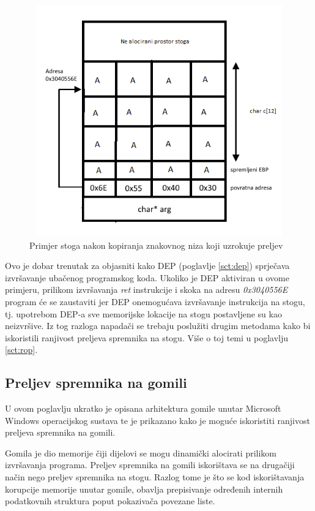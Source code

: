 \documentclass[times, utf8, diplomski, numeric]{fer}
\begin{document}
\begin{figure}[!ht]
\centering
\setlength\fboxsep{0pt}
\setlength\fboxrule{0.5pt}
\includegraphics[width=12cm, height=10cm]{slike/buffer_overflow_overflow}
\caption{Primjer stoga nakon kopiranja znakovnog niza koji uzrokuje preljev}
\label{fig:buff_overflow_overflow} 
\end{figure}

Ovo je dobar trenutak za objasniti kako DEP (poglavlje \ref{sct:dep}) 
sprječava izvršavanje ubačenog programskog koda. Ukoliko je DEP				%
aktiviran u ovome primjeru, prilikom izvršavanja \emph{ret}
instrukcije i skoka na adresu \emph{0x3040556E} program će se
zaustaviti jer DEP onemogućava izvršavanje instrukcija na stogu,
tj. upotrebom DEP-a sve memorijske lokacije na stogu postavljene
su kao neizvršive. Iz tog razloga napadači se trebaju poslužiti
drugim metodama kako bi iskoristili ranjivost preljeva spremnika
na stogu. Više o toj temi u poglavlju \ref{sct:rop}.

\subsection{Preljev spremnika na gomili}
\label{scr:heap_overflow}

U ovom poglavlju ukratko je opisana arhitektura gomile unutar
Microsoft Windows operacijskog sustava te je prikazano kako je
moguće iskoristiti ranjivost preljeva spremnika na gomili.

Gomila je dio memorije čiji dijelovi se mogu dinamički alocirati
prilikom izvršavanja programa. Preljev spremnika na gomili
iskorištava se na drugačiji način nego preljev spremnika na
stogu. Razlog tome je što se kod iskorištavanja korupcije
memorije unutar gomile, obavlja prepisivanje određenih internih
podatkovnih struktura poput pokazivača povezane liste.
\end{document}
